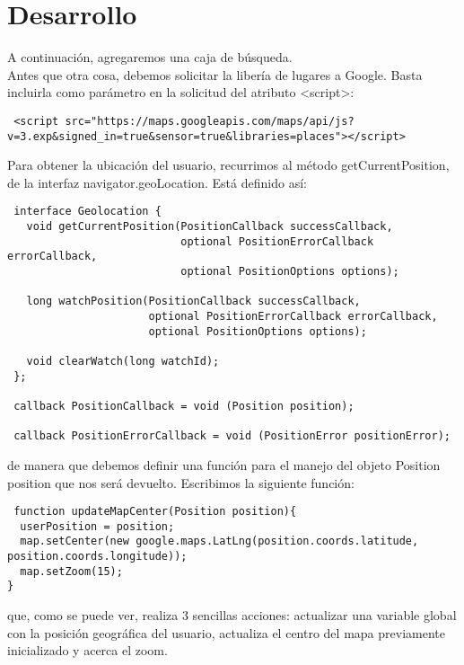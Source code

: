 \section{Desarrollo}

A continuación, agregaremos una caja de búsqueda. 
\\
Antes que otra cosa, debemos solicitar la libería de lugares a Google. Basta incluirla como parámetro en la solicitud del atributo <script>:

\begin{lstlisting}
 <script src="https://maps.googleapis.com/maps/api/js?v=3.exp&signed_in=true&sensor=true&libraries=places"></script>
 \end{lstlisting}

 Para obtener la ubicación del usuario, recurrimos al método getCurrentPosition, de la interfaz navigator.geoLocation. Está definido así:

\begin{lstlisting}
 interface Geolocation { 
   void getCurrentPosition(PositionCallback successCallback,
                           optional PositionErrorCallback errorCallback,
                           optional PositionOptions options);

   long watchPosition(PositionCallback successCallback,
                      optional PositionErrorCallback errorCallback,
                      optional PositionOptions options);

   void clearWatch(long watchId);
 };

 callback PositionCallback = void (Position position);

 callback PositionErrorCallback = void (PositionError positionError);
 \end{lstlisting}

 de manera que debemos definir una función para el manejo del objeto Position position que nos será devuelto. Escribimos la siguiente función:

 \begin{lstlisting}
 function updateMapCenter(Position position){
  userPosition = position;
  map.setCenter(new google.maps.LatLng(position.coords.latitude, position.coords.longitude));
  map.setZoom(15);
}
\end{lstlisting}

que, como se puede ver, realiza 3 sencillas acciones: actualizar una variable global con la posición geográfica del usuario, actualiza el centro del mapa previamente inicializado y acerca el zoom.

